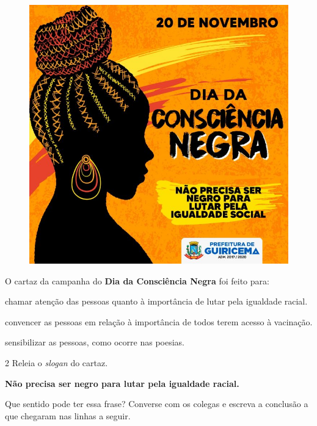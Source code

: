 \begin{figure}[htpb!]
\centering
\includegraphics[width=.8\textwidth]{media/image14.jpeg}
\end{figure}

\pagebreak
O cartaz da campanha do \textbf{Dia da Consciência Negra} foi feito para:

\begin{boxlist}
 chamar atenção das pessoas quanto à importância de lutar pela igualdade racial.

 convencer as pessoas em relação à importância de todos terem acesso à vacinação.

 sensibilizar as pessoas, como ocorre nas poesias.
\end{boxlist}

\num{2} Releia o \emph{slogan} do cartaz.

\begin{myquote}
\textbf{Não precisa ser negro para lutar pela igualdade racial.}
\end{myquote}

Que sentido pode ter essa frase? Converse com os colegas e escreva a
conclusão a que chegaram nas linhas a seguir.


